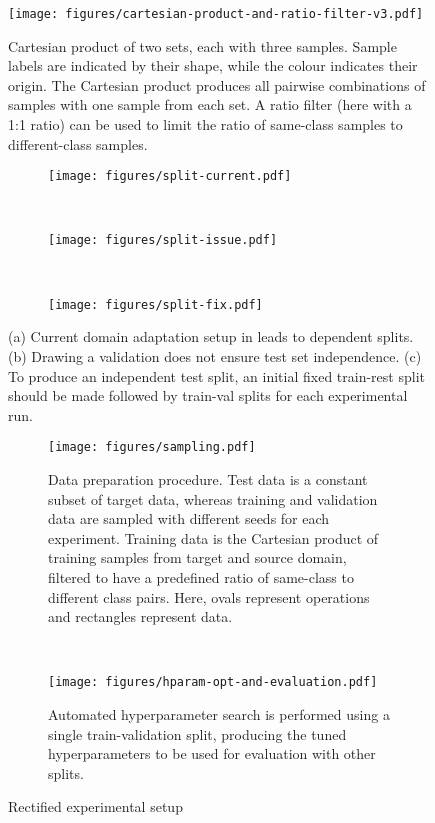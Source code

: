 \documentclass[journal]{IEEEtran}
\begin{document}
\begin{figure}[t]
    \centering
    \texttt{[image: figures/cartesian-product-and-ratio-filter-v3.pdf]}
    \caption{Cartesian product of two sets, each with three samples. Sample labels are indicated by their shape, while the colour indicates their origin. The Cartesian product produces all pairwise combinations of samples with one sample from each set. A ratio filter (here with a 1:1 ratio) can be used to limit the ratio of same-class samples to different-class samples.}
    \label{fig:cartesian}
\end{figure}

\begin{figure}
    \centering
    \begin{subfigure}[b]{0.3\linewidth}
        \texttt{[image: figures/split-current.pdf]}
		\caption{}
\label{fig:no-val}
	\end{subfigure}
	\ \ \ 
    \begin{subfigure}[b]{0.3\linewidth}
        \texttt{[image: figures/split-issue.pdf]}
        \caption{}
\label{fig:bad-val}
	\end{subfigure}
	\ \ \ 
	\begin{subfigure}[b]{0.3\linewidth}
	    \texttt{[image: figures/split-fix.pdf]}
	    \caption{}
\label{fig:good-val}
	\end{subfigure}
    \caption{(a) Current domain adaptation setup in \cite{motiian2017ccsa, xu2019dsne} leads to dependent splits. (b) Drawing a validation does not ensure test set independence. (c) To produce an independent test split, an initial fixed train-rest split should be made followed by train-val splits for each experimental run. }
    \label{fig:split-issues}
\end{figure}

\begin{figure*}
    \centering
    \begin{subfigure}[b]{0.65\linewidth}
        \texttt{[image: figures/sampling.pdf]}
        \caption{Data preparation procedure. Test data is a constant subset of target data, whereas training and validation data are sampled with different seeds for each experiment. Training data is the Cartesian product of training samples from target and source domain, filtered to have a predefined ratio of same-class to different class pairs. Here, ovals represent operations and rectangles represent data.}
        \label{fig:data-prep}
	\end{subfigure}
	\ \ \ \ \ \ \
	\begin{subfigure}[b]{0.27\linewidth}
	    \texttt{[image: figures/hparam-opt-and-evaluation.pdf]}
	    \caption{Automated hyperparameter search is performed using a single train-validation split, producing the tuned hyperparameters to be used for evaluation with other splits.}
		\label{fig:hparam-and-eval}
	\end{subfigure}
	\caption{Rectified experimental setup}
\end{figure*}
\end{document}
